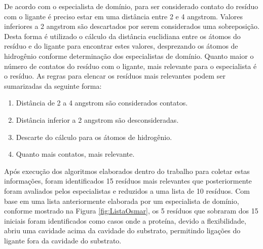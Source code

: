 De acordo com o especialista de domínio, para ser considerado contato do resíduo com o ligante é preciso estar em uma distância entre 2 e 4 angstrom. Valores inferiores a 2 angstrom são descartados por serem considerados uma sobreposição. Desta forma é utilizado o cálculo da distância euclidiana entre os átomos do resíduo e do ligante \cite{KARANADUNOSM09} para encontrar estes valores, desprezando os átomos de hidrogênio conforme determinação dos especialistas de domínio. Quanto maior o número de contatos do resíduo com o ligante, mais relevante para o especialista é o resíduo. As regras para elencar os resíduos mais relevantes podem ser sumarizadas da seguinte forma:

\begin{enumerate}
    \item Distância de 2 a 4 angstrom são considerados contatos.
    \item Distância inferior a 2 angstrom são desconsideradas. 
    \item Descarte do cálculo para os átomos de hidrogênio.
    \item Quanto mais contatos, mais relevante.
\end{enumerate}

Após execução dos algoritmos elaborados dentro do trabalho para coletar estas informações, foram identificados 15 resíduos mais relevantes que posteriormente foram avaliados pelos especialistas e reduzidos a uma lista de 10 resíduos. Com base em uma lista anteriormente elaborada por um especialista de domínio, conforme mostrado na Figura \ref{fig:ListaOsmar}, os 5 resíduos que sobraram dos 15 iniciais foram identificados como casos onde a proteína, devido a flexibilidade, abriu uma cavidade acima da cavidade do substrato, permitindo ligações do ligante fora da cavidade do substrato.

